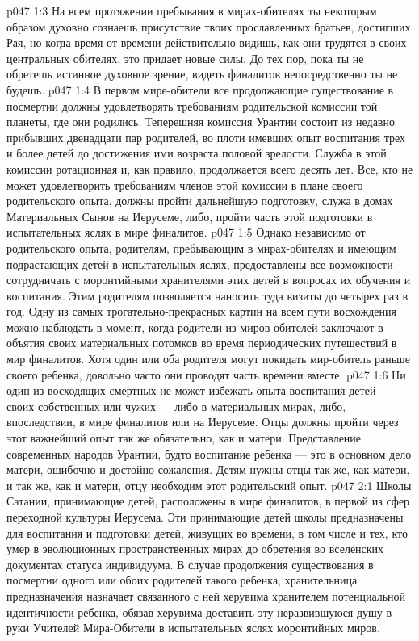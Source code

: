 \vs p047 1:3 На всем протяжении пребывания в мирах\hyp{}обителях ты некоторым образом духовно сознаешь присутствие твоих прославленных братьев, достигших Рая, но когда время от времени действительно видишь, как они трудятся в своих центральных обителях, это придает новые силы. До тех пор, пока ты не обретешь истинное духовное зрение, видеть финалитов непосредственно ты не будешь.
\vs p047 1:4 \pc В первом мире\hyp{}обители все продолжающие существование в посмертии должны удовлетворять требованиям родительской комиссии той планеты, где они родились. Теперешняя комиссия Урантии состоит из недавно прибывших двенадцати пар родителей, во плоти имевших опыт воспитания трех и более детей до достижения ими возраста половой зрелости. Служба в этой комиссии ротационная и, как правило, продолжается всего десять лет. Все, кто не может удовлетворить требованиям членов этой комиссии в плане своего родительского опыта, должны пройти дальнейшую подготовку, служа в домах Материальных Сынов на Иерусеме, либо, пройти часть этой подготовки в испытательных яслях в мире финалитов.
\vs p047 1:5 Однако независимо от родительского опыта, родителям, пребывающим в мирах\hyp{}обителях и имеющим подрастающих детей в испытательных яслях, предоставлены все возможности сотрудничать с моронтийными хранителями этих детей в вопросах их обучения и воспитания. Этим родителям позволяется наносить туда визиты до четырех раз в год. Одну из самых трогательно\hyp{}прекрасных картин на всем пути восхождения можно наблюдать в момент, когда родители из миров\hyp{}обителей заключают в объятия своих материальных потомков во время периодических путешествий в мир финалитов. Хотя один или оба родителя могут покидать мир\hyp{}обитель раньше своего ребенка, довольно часто они проводят часть времени вместе.
\vs p047 1:6 Ни один из восходящих смертных не может избежать опыта воспитания детей --- своих собственных или чужих --- либо в материальных мирах, либо, впоследствии, в мире финалитов или на Иерусеме. Отцы должны пройти через этот важнейший опыт так же обязательно, как и матери. Представление современных народов Урантии, будто воспитание ребенка --- это в основном дело матери, ошибочно и достойно сожаления. Детям нужны отцы так же, как матери, и так же, как и матери, отцу необходим этот родительский опыт.
\vs p047 2:1 Школы Сатании, принимающие детей, расположены в мире финалитов, в первой из сфер переходной культуры Иерусема. Эти принимающие детей школы предназначены для воспитания и подготовки детей, живущих во времени, в том числе и тех, кто умер в эволюционных пространственных мирах до обретения во вселенских документах статуса индивидуума. В случае продолжения существования в посмертии одного или обоих родителей такого ребенка, хранительница предназначения назначает связанного с ней херувима хранителем потенциальной идентичности ребенка, обязав херувима доставить эту неразвившуюся душу в руки Учителей Мира\hyp{}Обители в испытательных яслях моронтийных миров.
